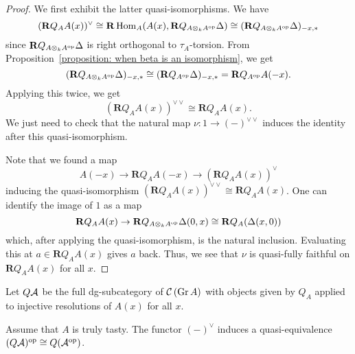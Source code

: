 \begin{proof}
  We first exhibit the latter quasi-isomorphisms. We have 
  \begin{displaymath}
    (\mathbf{R}Q_A A(x))^\vee \cong \mathbf{R}\operatorname{Hom}_A (A(x), \mathbf{R}Q_{A \otimes_k A^{\operatorname{op}}} \Delta) \cong (\mathbf{R}Q_{A \otimes_k A^{\operatorname{op}}} \Delta)_{-x,\ast}
  \end{displaymath}
  since \(\mathbf{R}Q_{A \otimes_k A^{\operatorname{op}}} \Delta\) is right orthogonal to \(\tau_A\)-torsion. From Proposition~\ref{proposition: when beta is an isomorphism}, we get 
  \begin{displaymath}
    (\mathbf{R}Q_{A \otimes_k A^{\operatorname{op}}} \Delta)_{-x,\ast} \cong (\mathbf{R}Q_{A^{\operatorname{op}}} \Delta)_{-x,\ast} = \mathbf{R}Q_{A^{\operatorname{op}}} A(-x).
  \end{displaymath}
  Applying this twice, we get 
  \begin{displaymath}
    (\mathbf{R}Q_A A(x))^{\vee \vee} \cong \mathbf{R}Q_A A(x).
  \end{displaymath}
  We just need to check that the natural map \(\nu : 1 \to (-)^{\vee \vee}\) induces the identity after this quasi-isomorphism.

  Note that we found a map
  \begin{displaymath}
    A(-x) \to \mathbf{R}Q_A A(-x) \to ( \mathbf{R}Q_A A(x) )^\vee 
  \end{displaymath}
  inducing the quasi-isomorphism \((\mathbf{R}Q_A A(x))^{\vee \vee} \cong \mathbf{R}Q_A A(x)\). One can identify the image of \(1\) as a map 
  \begin{displaymath}
    \mathbf{R}Q_A A(x) \to \mathbf{R}Q_{A \otimes_k A^{\operatorname{op}}} \Delta (0,x) \cong \mathbf{R}Q_A ( \Delta (x,0) )
  \end{displaymath}
  which, after applying the quasi-isomorphism, is the natural inclusion. Evaluating this at \(a \in \mathbf{R}Q_A A(x)\) gives \(a\) back. Thus, we see that \(\nu\) is quasi-fully faithful on \(\mathbf{R}Q_A A(x)\) for all \(x\). 
\end{proof}

\begin{definition}
  Let \(Q\mathcal{A}\) be the full dg-subcategory of \(\mathcal{C}\left(\operatorname{Gr}A\right)\) with objects given by \(Q_A\) applied to injective resolutions of \(A(x)\) for all \(x\). 
\end{definition}

\begin{corollary} \label{corollary: duality is a duality}
  Assume that \(A\) is truly tasty. The functor \((-)^\vee\) induces a quasi-equivalence \((Q\mathcal{A})^{\operatorname{op}} \cong Q(\mathcal{A}^{\operatorname{op}})\). 
\end{corollary}

